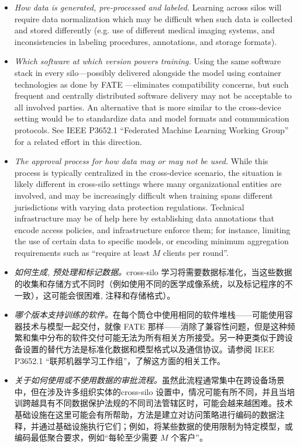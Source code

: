 \begin{itemize}
    \item \emph{How data is generated, pre-processed and labeled.}  Learning across silos will require data normalization which may be difficult when such data is collected and stored differently (e.g. use of different medical imaging systems, and inconsistencies in labeling procedures, annotations, and storage formats).
    \item \emph{Which software at which version powers training.} Using the same software stack in every silo---possibly delivered alongside the model using container technologies as done by FATE \cite{FATE}---eliminates compatibility concerns, but such frequent and centrally distributed software delivery may not be acceptable to all involved parties. An alternative that is more similar to the cross-device setting would be to standardize data and model formats and communication protocols. See IEEE P3652.1 ``Federated Machine Learning Working Group'' for a related effort in this direction.
    \item \emph{The approval process for how data may or may not be used.} While this process is typically centralized in the cross-device scenario, the situation is likely different in cross-silo settings where many organizational entities are involved, and may be increasingly difficult when training spans different jurisdictions with varying data protection regulations. Technical infrastructure may be of help here by establishing data annotations that encode access policies, and infrastructure enforce them; for instance, limiting the use of certain data to specific models, or encoding minimum aggregation requirements such as ``require at least $M$ clients per round''.
    \item \emph{如何生成, 预处理和标记数据。}cross-silo 学习将需要数据标准化，当这些数据的收集和存储方式不同时（例如使用不同的医学成像系统，以及标记程序的不一致），这可能会很困难, 注释和存储格式）。
    \item \emph{哪个版本支持训练的软件。}在每个筒仓中使用相同的软件堆栈——可能使用容器技术与模型一起交付，就像 FATE \cite{FATE} 那样——消除了兼容性问题，但是这种频繁和集中分布的软件交付可能无法为所有相关方所接受。另一种更类似于跨设备设置的替代方法是标准化数据和模型格式以及通信协议。请参阅 IEEE P3652.1 ``联邦机器学习工作组''，了解这方面的相关工作。
    \item \emph{关于如何使用或不使用数据的审批流程。}虽然此流程通常集中在跨设备场景中，但在涉及许多组织实体的cross-silo 设置中，情况可能有所不同，并且当培训跨越具有不同数据保护法规的不同司法管辖区时，可能会越来越困难。技术基础设施在这里可能会有所帮助，方法是建立对访问策略进行编码的数据注释，并通过基础设施执行它们；例如，将某些数据的使用限制为特定模型，或编码最低聚合要求，例如“每轮至少需要 $M$ 个客户”。
\end{itemize}
    
